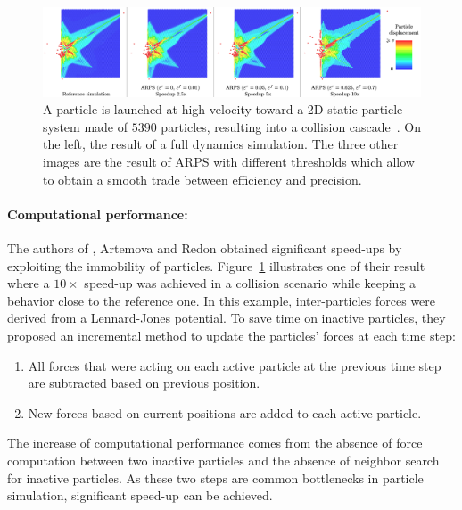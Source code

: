 \begin{figure}[h!]
	\centering
	\includegraphics[width=1.0\linewidth]{images/arps-vriphys2013/ARPS_Collision_Artemova.png}
	\caption[ARPS: Collision Cascade from \cite{Artemova2012}]{\label{fig:cascadeCollision} 
		A particle is launched at high velocity toward a 2D static particle system made of $5390$ particles, resulting into a collision cascade~\cite{Artemova2012}. 
		On the left, the result of a full dynamics simulation. 
		The three other images are the result of ARPS with different thresholds which allow to obtain a smooth trade between efficiency and precision.}
\end{figure}

\paragraph*{Computational performance:}
The authors of \cite{Artemova2012}, Artemova and Redon obtained significant speed-ups by exploiting the immobility of particles. Figure~\ref{fig:cascadeCollision} illustrates one of their result where a $10\times$ speed-up was achieved in a collision scenario while keeping a behavior close to the reference one. In this example, inter-particles forces were derived from a Lennard-Jones potential. To save time on inactive particles, they proposed an incremental method to update the particles' forces at each time step:
\begin{enumerate}
    \item All forces that were acting on each active particle at the previous time step are subtracted based on previous position.
    \item New forces based on current positions are added to each active particle.
\end{enumerate}
The increase of computational performance comes from the absence of force computation between
two inactive particles and the absence of neighbor search for inactive particles.
As these two steps are common bottlenecks in particle simulation, significant speed-up can be achieved.

